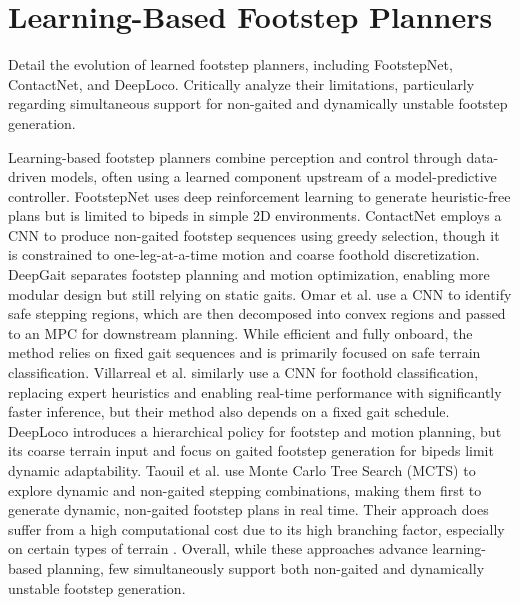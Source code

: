 \section{Learning-Based Footstep Planners}

\begin{outline}
  Detail the evolution of learned footstep planners, including
  FootstepNet, ContactNet, and DeepLoco. Critically analyze their
  limitations, particularly regarding simultaneous support for
  non-gaited and dynamically unstable footstep generation.
\end{outline}

Learning-based footstep planners combine perception and control
through data-driven models, often using a learned component upstream
of a model-predictive controller. FootstepNet
\cite{gaspard_footstepnet_2024} uses deep reinforcement learning to
generate heuristic-free plans but is limited to bipeds in simple 2D
environments. ContactNet \cite{bratta_contactnet_2024} employs a CNN
to produce non-gaited footstep sequences using greedy selection,
though it is constrained to one-leg-at-a-time motion and coarse
foothold discretization. DeepGait \cite{tsounis_deepgait_2020}
separates footstep planning and motion optimization, enabling more
modular design but still relying on static gaits. Omar et al.
\cite{omar_fast_2022} use a CNN to identify safe stepping regions,
which are then decomposed into convex regions and passed to an MPC
for downstream planning. While efficient and fully onboard, the
method relies on fixed gait sequences and is primarily focused on
safe terrain classification. Villarreal et al.
\cite{villarreal_fast_2019} similarly use a CNN for foothold
classification, replacing expert heuristics and enabling real-time
performance with significantly faster inference, but their method
also depends on a fixed gait schedule. DeepLoco
\cite{peng_deeploco_2017} introduces a hierarchical policy for
footstep and motion planning, but its coarse terrain input and focus
on gaited footstep generation for bipeds limit dynamic adaptability.
Taouil et al. \cite{taouil_non-gaited_2025} use Monte Carlo Tree
Search (MCTS) to explore dynamic and non-gaited stepping
combinations, making them first to generate dynamic, non-gaited
footstep plans in real time. Their approach does suffer from a high
computational cost due to its high branching factor, especially on
certain types of terrain \cite{bratta_contactnet_2024}. Overall,
while these approaches advance learning-based planning, few
simultaneously support both non-gaited and dynamically unstable
footstep generation.
